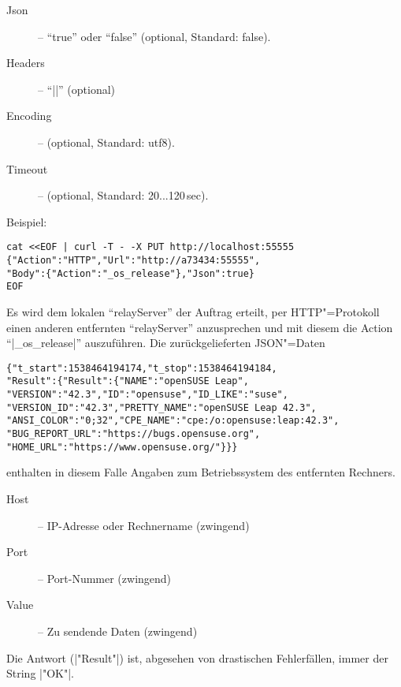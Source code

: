 \documentclass[titlepage=false,toc=nobibliography]{vl-report}
\newcommand*\theServer{relayServer}
\newcommand*\action[1]{\fbox{\nolinkurl{#1}}\medskip\par}
\begin{document}
\begin{description}
\begin{description}
\begin{description}
        \item[Json] -- "`true"' oder "`false"' (optional, Standard: false).
        \item[Headers] -- "`|{}|"' (optional)
        \item[Encoding] -- (optional, Standard: utf8).
        \item[Timeout] -- (optional, Standard: 20...120\,sec).

      \end{description}
Beispiel:
\begin{lstlisting}[language={}]
cat <<EOF | curl -T - -X PUT http://localhost:55555
{"Action":"HTTP","Url":"http://a73434:55555",
"Body":{"Action":"_os_release"},"Json":true}
EOF
\end{lstlisting}
Es wird dem lokalen "`\theServer"' der Auftrag erteilt, per HTTP"=Protokoll 
einen anderen entfernten "`\theServer"' anzusprechen und mit diesem die Action  
"`|_os_release|"' auszuführen. Die zurückgelieferten JSON"=Daten
\begin{lstlisting}[language={}]
{"t_start":1538464194174,"t_stop":1538464194184,
"Result":{"Result":{"NAME":"openSUSE Leap",
"VERSION":"42.3","ID":"opensuse","ID_LIKE":"suse",
"VERSION_ID":"42.3","PRETTY_NAME":"openSUSE Leap 42.3",
"ANSI_COLOR":"0;32","CPE_NAME":"cpe:/o:opensuse:leap:42.3",
"BUG_REPORT_URL":"https://bugs.opensuse.org",
"HOME_URL":"https://www.opensuse.org/"}}}
\end{lstlisting}
enthalten in diesem Falle Angaben zum Betriebssystem des entfernten Rechners.

    \item \action{UDP}

      \begin{description}

        \item[Host] -- IP-Adresse oder Rechnername (zwingend)

        \item[Port] -- Port-Nummer (zwingend)

        \item[Value] -- Zu sendende Daten (zwingend)

      \end{description}

      \noindent Die Antwort (|"Result"|) ist, abgesehen von drastischen
      Fehlerfällen, immer der String |"OK"|.

    \item \action{EMAIL}

      \begin{description}


\end{description}
\end{description}
\end{description}
\end{document}

